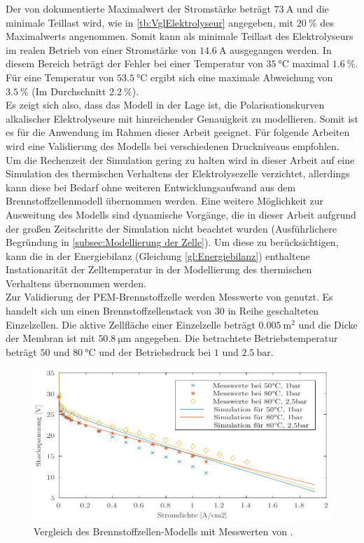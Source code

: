 Der von \citet{hammoudi_new_2012} dokumentierte Maximalwert der Stromstärke beträgt $\SI{73}{\A}$ und die minimale Teillast wird, wie in \ref{tb:VglElektrolyseur} angegeben, mit $\SI{20}{\%}$ des Maximalwerts angenommen. Somit kann als minimale Teillast des Elektrolyseurs im realen Betrieb von einer Stromstärke von $\SI{14,6}{\A}$ ausgegangen werden. In diesem Bereich beträgt der Fehler bei einer Temperatur von $\SI{35}{\degreeCelsius}$ maximal $\SI{1,6}{\%}$. Für eine Temperatur von $\SI{53,5}{\degreeCelsius}$ ergibt sich eine maximale Abweichung von $\SI{3,5}{\%}$ (Im Durchschnitt $\SI{2,2}{\%}$).\\
Es zeigt sich also, dass das Modell in der Lage ist, die Polarisationskurven alkalischer Elektrolyseure mit hinreichender Genauigkeit zu modellieren. Somit ist es für die Anwendung im Rahmen dieser Arbeit geeignet. Für folgende Arbeiten wird eine Validierung des Modells bei verschiedenen Druckniveaus empfohlen.\\

Um die Rechenzeit der Simulation gering zu halten wird in dieser Arbeit auf eine Simulation des thermischen Verhaltens der Elektrolysezelle verzichtet, allerdings kann diese bei Bedarf ohne weiteren Entwicklungsaufwand aus dem Brennstoffzellenmodell übernommen werden.
Eine weitere Möglichkeit zur Ausweitung des Modells sind dynamische Vorgänge, die in dieser Arbeit aufgrund der großen Zeitschritte der Simulation nicht beachtet wurden (Ausführlichere Begründung in \ref{subsec:Modellierung der Zelle}). Um diese zu berücksichtigen, kann die in der Energiebilanz (Gleichung \ref{gl:Energiebilanz}) enthaltene Instationarität der Zelltemperatur in der Modellierung des thermischen Verhaltens übernommen werden.\\

Zur Validierung der PEM-Brennstoffzelle werden Messwerte von \citet{chugh_experimental_2020} genutzt. Es handelt sich um einen Brennstoffzellenstack von 30 in Reihe geschalteten Einzelzellen. Die aktive Zellfläche einer Einzelzelle beträgt $\SI{0,005}{\m\squared}$ und die Dicke der Membran ist mit $\SI{50,8}{\micro\m}$ angegeben. Die betrachtete Betriebstemperatur beträgt $50$ und $\SI{80}{\degreeCelsius}$ und der Betriebsdruck bei $1$ und $\SI{2,5}{\bar}$.

\begin{figure}[h]
	\centering
		\includegraphics[scale=1]{Figures/ValidierungPEMFC}
		\caption{Vergleich des Brennstoffzellen-Modells mit Messwerten von \citet{chugh_experimental_2020}.}
\label{fig:ValPEMFC}	
\end{figure}

